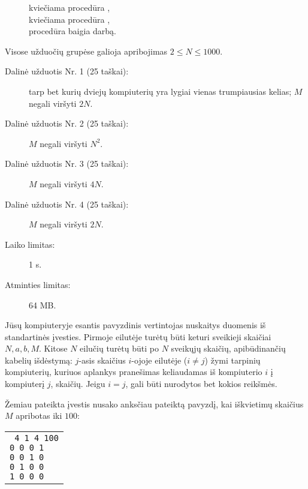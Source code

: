 \documentclass{boi2014-lt}
\begin{document}
    \begin{figure}[H]
        \centering
        kviečiama procedūra , \\
        kviečiama procedūra , \\
        procedūra  baigia darbą.
    \end{figure}

    \Scoring
    Visose užduočių grupėse galioja apribojimas $2 \le N \le 1000$.

    \begin{description}
        \item[Dalinė užduotis Nr. 1 (25 taškai):] tarp bet kurių dviejų kompiuterių yra
            lygiai vienas trumpiausias kelias; $M$ negali viršyti $2N$.
        \item[Dalinė užduotis Nr. 2 (25 taškai):] $M$ negali viršyti $N^2$.
        \item[Dalinė užduotis Nr. 3 (25 taškai):] $M$ negali viršyti $4N$.
        \item[Dalinė užduotis Nr. 4 (25 taškai):] $M$ negali viršyti $2N$.
    \end{description}

    \Constraints
    \begin{description}
        \item[Laiko limitas:] 1 s.
        \item[Atminties limitas:] 64 MB.
    \end{description}

    \Experimentation
    Jūsų kompiuteryje esantis pavyzdinis vertintojas nuskaitys duomenis iš
    standartinės įvesties. Pirmoje eilutėje turėtų būti keturi sveikieji
    skaičiai $N, a, b, M$. Kitose $N$ eilučių turėtų būti po $N$ sveikųjų
    skaičių, apibūdinančių kabelių išdėstymą:
    $j$-asis skaičius $i$-ojoje eilutėje ($i \neq j$) žymi tarpinių
    kompiuterių, kuriuos aplankys pranešimas keliaudamas iš kompiuterio $i$ į
    kompiuterį $j$, skaičių. Jeigu $i = j$, gali būti nurodytos bet kokios
    reikšmės.

    Žemiau pateikta įvestis nusako anksčiau pateiktą pavyzdį, kai iškvietimų
    skaičius $M$ apribotas iki $100$:

    \begin{center}
        \begin{tabular}{p{4cm}}
            {\tt
                4 1 4 100 \newline
                0 0 0 1 \newline
                0 0 1 0 \newline
                0 1 0 0 \newline
                1 0 0 0
            }
        \end{tabular}
    \end{center}
\end{document}
